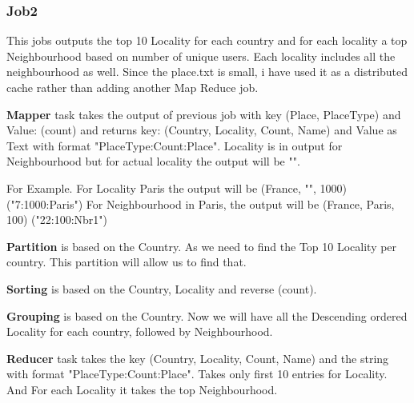 \subsubsection{Job2}

This jobs outputs the top 10 Locality for each country and for each locality a top Neighbourhood based on number of unique users. Each locality includes all the neighbourhood as well. Since the place.txt is small, i have used it as a distributed cache rather than adding another Map Reduce job.
	
	\textbf{Mapper} task takes the output of previous job with key (Place, PlaceType) and Value: (count) and returns key: (Country, Locality, Count, Name) and Value as Text with format "PlaceType:Count:Place".  Locality is in output for Neighbourhood but for actual locality the output will be "".
	
		For Example. For Locality Paris the output will be (France, "", 1000) ("7:1000:Paris")
							For Neighbourhood in Paris, the output will be (France, Paris, 100) ("22:100:Nbr1")
	
	\textbf{Partition} is based on the Country. As we need to find the Top 10 Locality per country. This partition will allow us to find that. 
	
	\textbf{Sorting} is based on the Country, Locality and reverse (count). 
	
	\textbf{Grouping} is based on the Country. Now we will have all the Descending ordered Locality for each country, followed by Neighbourhood.
	
	\textbf{Reducer} task takes the key (Country, Locality, Count, Name) and the string with format "PlaceType:Count:Place". Takes only first 10 entries for Locality. And For each Locality it takes the top Neighbourhood. 

